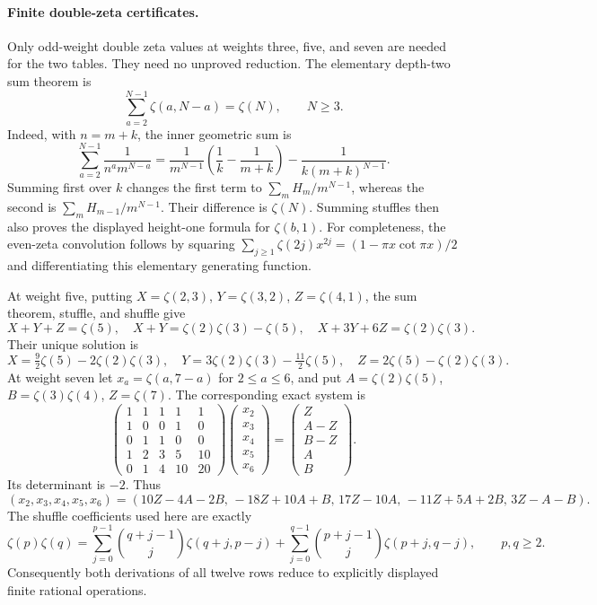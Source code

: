 \paragraph{Finite double-zeta certificates.}
Only odd-weight double zeta values at weights three, five, and seven are
needed for the two tables. They need no unproved reduction. The elementary
depth-two sum theorem is
\[
 \sum_{a=2}^{N-1}\zeta(a,N-a)=\zeta(N),\qquad N\ge3.
\]
Indeed, with $n=m+k$, the inner geometric sum is
\[
 \sum_{a=2}^{N-1}\frac1{n^a m^{N-a}}
 =\frac1{m^{N-1}}\left(\frac1k-\frac1{m+k}\right)
      -\frac1{k(m+k)^{N-1}}.
\]
Summing first over $k$ changes the first term to
$\sum_mH_m/m^{N-1}$, whereas the second is
$\sum_mH_{m-1}/m^{N-1}$. Their difference is $\zeta(N)$.
Summing stuffles then also proves the displayed height-one formula for
$\zeta(b,1)$. For completeness, the even-zeta convolution follows by
squaring $\sum_{j\ge1}\zeta(2j)x^{2j}=(1-\pi x\cot\pi x)/2$
and differentiating this elementary generating function.

At weight five, putting $X=\zeta(2,3)$, $Y=\zeta(3,2)$,
$Z=\zeta(4,1)$, the sum theorem, stuffle, and shuffle give
\[
 X+Y+Z=\zeta(5),\quad X+Y=\zeta(2)\zeta(3)-\zeta(5),\quad
 X+3Y+6Z=\zeta(2)\zeta(3).
\]
Their unique solution is
\[
 X=\tfrac92\zeta(5)-2\zeta(2)\zeta(3),\quad
 Y=3\zeta(2)\zeta(3)-\tfrac{11}2\zeta(5),\quad
 Z=2\zeta(5)-\zeta(2)\zeta(3).
\]
At weight seven let $x_a=\zeta(a,7-a)$ for $2\le a\le6$, and put
$A=\zeta(2)\zeta(5)$, $B=\zeta(3)\zeta(4)$, $Z=\zeta(7)$.
The corresponding exact system is
\[
 \begin{pmatrix}
 1&1&1&1&1\\1&0&0&1&0\\0&1&1&0&0\\
 1&2&3&5&10\\0&1&4&10&20
 \end{pmatrix}
 \begin{pmatrix}x_2\\x_3\\x_4\\x_5\\x_6\end{pmatrix}
 =\begin{pmatrix}Z\\A-Z\\B-Z\\A\\B\end{pmatrix}.
\]
Its determinant is $-2$. Thus
\[
 (x_2,x_3,x_4,x_5,x_6)
 =(10Z-4A-2B,\,-18Z+10A+B,\,17Z-10A,\,-11Z+5A+2B,\,3Z-A-B).
\]
The shuffle coefficients used here are exactly
\[
 \zeta(p)\zeta(q)=
 \sum_{j=0}^{p-1}\binom{q+j-1}{j}\zeta(q+j,p-j)
 +\sum_{j=0}^{q-1}\binom{p+j-1}{j}\zeta(p+j,q-j),\qquad p,q\ge2.
\]
Consequently both derivations of all twelve rows reduce to explicitly
displayed finite rational operations.

